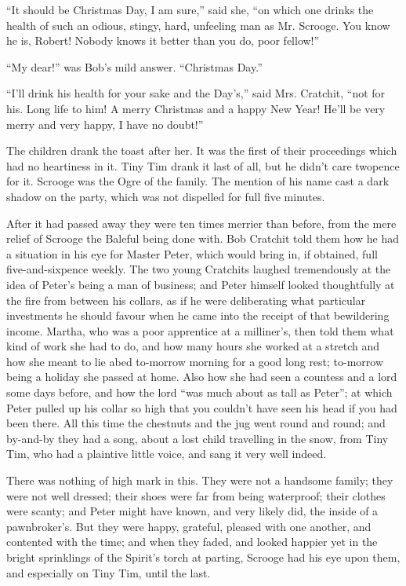 \documentclass[paper=5.5in:8.5in,BCOR=15mm,twoside,DIV=15,headinclude=off,12pt,chapterprefix=off,openany,headings=huge]{scrbook} %
\begin{document}
\enquote{It should be Christmas Day, I am sure,} said she, \enquote{on which one drinks the health of such an odious, stingy, hard, unfeeling man as Mr. Scrooge. You know he is, Robert! Nobody knows it better than you do, poor fellow!}

\enquote{My dear!} was Bob's mild answer. \enquote{Christmas Day.}

\enquote{I'll drink his health for your sake and the Day's,} said Mrs. Cratchit, \enquote{not for his. Long life to him! A merry Christmas and a happy New Year! He'll be very merry and very happy, I have no doubt!}

The children drank the toast after her. It was the first of their proceedings which had no heartiness in it. Tiny Tim drank it last of all, but he didn't care twopence for it. Scrooge was the Ogre of the family. The mention of his name cast a dark shadow on the party, which was not dispelled for full five minutes.

After it had passed away they were ten times merrier than before, from the mere relief of Scrooge the Baleful being done with. Bob Cratchit told them how he had a situation in his eye for Master Peter, which would bring in, if obtained, full five-and-sixpence weekly. The two young Cratchits laughed tremendously at the idea of Peter's being a man of business; and Peter himself looked thoughtfully at the fire from between his collars, as if he were deliberating what particular investments he should favour when he came into the receipt of that bewildering income. Martha, who was a poor apprentice at a milliner's, then told them what kind of work she had to do, and how many hours she worked at a stretch and how she meant to lie abed to-morrow morning for a good long rest; to-morrow being a holiday she passed at home. Also how she had seen a countess and a lord some days before, and how the lord \enquote{was much about as tall as Peter}; at which Peter pulled up his collar so high that you couldn't have seen his head if you had been there. All this time the chestnuts and the jug went round and round; and by-and-by they had a song, about a lost child travelling in the snow, from Tiny Tim, who had a plaintive little voice, and sang it very well indeed.

There was nothing of high mark in this. They were not a handsome family; they were not well dressed; their shoes were far from being waterproof; their clothes were scanty; and Peter might have known, and very likely did, the inside of a pawnbroker's. But they were happy, grateful, pleased with one another, and contented with the time; and when they faded, and looked happier yet in the bright sprinklings of the Spirit's torch at parting, Scrooge had his eye upon them, and especially on Tiny Tim, until the last.
\end{document}
